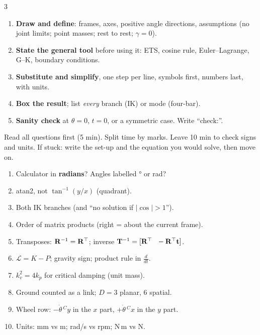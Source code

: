 \begin{multicols}{3}
\columnbreak
{}
\begin{enumerate}
\item \textbf{Draw and define}: frames, axes, positive angle directions, assumptions (no joint limits; point masses; rest to rest; $\gamma=0$).
\item \textbf{State the general tool} before using it: ETS, cosine rule, Euler–Lagrange, G–K, boundary conditions.
\item \textbf{Substitute and simplify}, one step per line, symbols first, numbers last, with units.
\item \textbf{Box the result}; list \emph{every} branch (IK) or mode (four-bar).
\item \textbf{Sanity check} at $\theta=0$, $t=0$, or a symmetric case. Write ``check:''.
\end{enumerate}
Read all questions first (5 min). Split time by marks. Leave 10 min to check signs and units. If stuck: write the set-up and the equation you would solve, then move on.

\begin{enumerate}
\item Calculator in \textbf{radians}? Angles labelled ° or rad?
\item atan2, not $\tan^{-1}(y/x)$ (quadrant).
\item Both IK branches (and ``no solution if $|\cos|>1$'').
\item Order of matrix products (right = about the current frame).
\item Transposes: $\mathbf R^{-1}=\mathbf R^\top$; inverse $\mathbf T^{-1}=[\mathbf R^\top\ \ -\mathbf R^\top\mathbf t]$.
\item $\mathcal L=K-P$; gravity sign; product rule in $\frac{d}{dt}$.
\item $k_v^2=4k_p$ for critical damping (unit mass).
\item Ground counted as a link; $D=3$ planar, 6 spatial.
\item Wheel row: $-\dot\theta\,{}^Cy$ in the $x$ part, $+\dot\theta\,{}^Cx$ in the $y$ part.
\item Units: mm vs m; rad/s vs rpm; N\,m vs N.
\end{enumerate}


\end{multicols}
